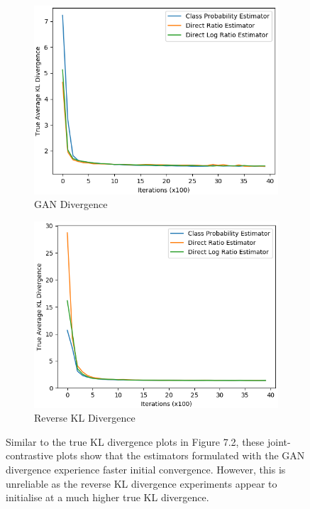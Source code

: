 \documentclass[honours,12pt]{unswthesis}
\numberwithin{equation}{section}
\theoremstyle{definition}
\begin{document}
\begin{figure}[h]
\begin{subfigure}{0.49\textwidth}
\includegraphics[width=\linewidth]{part2truklmins/JCADVvsJCADVexpvsJCADVgudlog.png}
\caption{GAN Divergence}
\end{subfigure}
\begin{subfigure}{0.49\textwidth}
\includegraphics[width=\linewidth]{part2truklmins/JCKLDvsJCKLexpvsJCKLgudlog.png}
\caption{Reverse KL Divergence}
\end{subfigure}
\caption{\small Similar to the true KL divergence plots in Figure 7.2, these joint-contrastive plots show that the estimators formulated with the GAN divergence experience faster initial convergence. However, this is unreliable as the reverse KL divergence experiments appear to initialise at a much higher true KL divergence.}
\end{figure}
\end{document}
